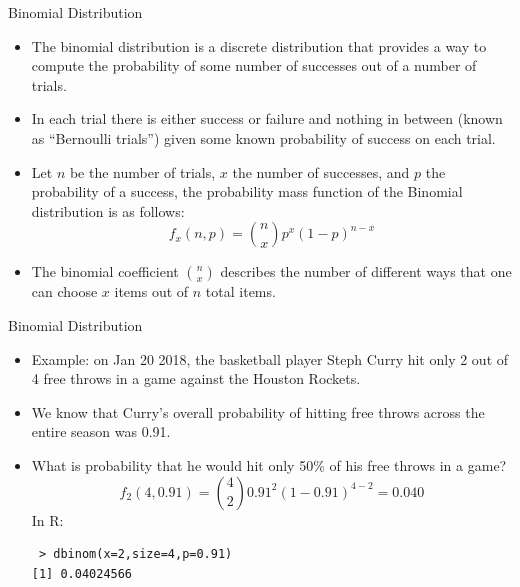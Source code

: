 \documentclass[handout]{beamer}
\begin{document}
\begin{frame}[fragile]{Binomial Distribution}

\scriptsize{
\begin{itemize}
 \item  The binomial distribution is a discrete distribution that provides a way to compute the probability of some number of successes out of a number of trials.
 \item In each trial there is either success or failure and nothing in between (known as “Bernoulli trials”) given some known probability of success on each trial.
 \item Let $n$ be the number of trials, $x$ the number of successes, and $p$ the probability of a success, the probability mass function of the Binomial distribution is as follows:
 \begin{displaymath}
  f_x(n,p)= {n \choose x}p^{x}(1-p)^{n-x} 
 \end{displaymath}
\item The binomial coefficient ${n \choose x}$ describes the number of different ways that one can choose $x$ items out of $n$ total items.

 \end{itemize}}
 
 \end{frame}
 
 
\begin{frame}[fragile]{Binomial Distribution}

\scriptsize{
\begin{itemize}
\item Example: on Jan 20 2018, the basketball player Steph Curry hit only 2 out of 4 free throws in a game against the Houston Rockets.
\item We know that Curry’s overall probability of hitting free throws across the entire season was 0.91.
\item What is probability that he would hit only 50\% of his free throws in a game?
\begin{displaymath}
 f_2(4,0.91) = {4 \choose 2}0.91^{2}(1-0.91)^{4-2}=0.040 
\end{displaymath}
In R: 
\begin{verbatim}
 > dbinom(x=2,size=4,p=0.91)
[1] 0.04024566
\end{verbatim}
 
 \end{itemize}}
 
 \end{frame}
\end{document}
